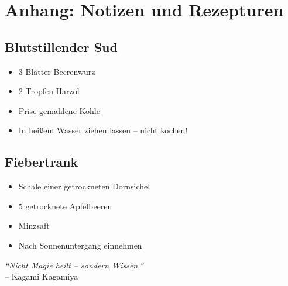 \documentclass[12pt,a4paper]{article}
\begin{document}
\newpage

\section{Anhang: Notizen und Rezepturen}

\subsection*{Blutstillender Sud}
\begin{itemize}
  \item 3 Blätter Beerenwurz
  \item 2 Tropfen Harzöl
  \item Prise gemahlene Kohle
  \item In heißem Wasser ziehen lassen – nicht kochen!
\end{itemize}

\subsection*{Fiebertrank}
\begin{itemize}
  \item Schale einer getrockneten Dornsichel
  \item 5 getrocknete Apfelbeeren
  \item Minzsaft
  \item Nach Sonnenuntergang einnehmen
\end{itemize}

\vfill

\begin{center}
    \textit{“Nicht Magie heilt – sondern Wissen.”} \\
    -- Kagami Kagamiya
\end{center}
\end{document}
